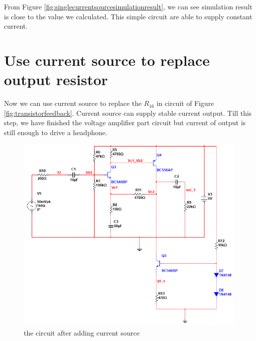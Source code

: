 From Figure \ref{fig:singlecurrentsourcesimulationresult}, we can see simulation result is close to the value we calculated. This simple circuit are able to supply constant current.


\section{Use current source to replace output resistor}

Now we can use current source to replace the  $ R_{16} $  in circuit of Figure \ref{fig:transistorfeedback}.
Current source can supply stable current output. Till this step, we have finished the voltage amplifier part circuit but current of output is still enough to drive a headphone.
 
\begin{figure}[htbp]
	\centering
	\includegraphics[scale=0.6 ]{"../Photo/Chap1/add cuurent source"}
	\caption{the circuit after adding current source}
	\label{fig:addcuurentsource}
\end{figure}